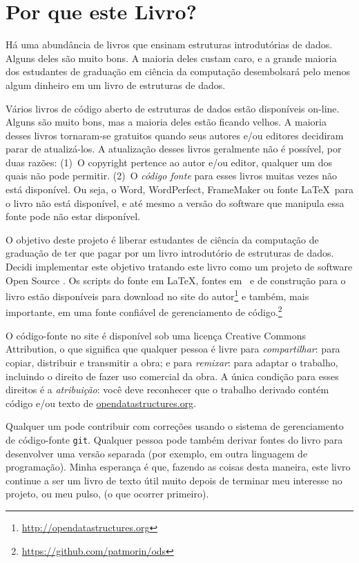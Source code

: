 \chapter*{Por que este Livro?}

Há uma abundância de livros que ensinam estruturas introdutórias de dados.
Alguns deles são muito bons. A maioria deles custam caro, e a grande 
maioria dos estudantes de graduação em ciência da computação 
desembolsará pelo menos algum dinheiro em um livro de estruturas 
de dados.

Vários livros de código aberto de estruturas de dados estão disponíveis on-line. Alguns são muito bons, mas a maioria deles estão ficando velhos. A maioria desses livros tornaram-se gratuitos quando seus autores e/ou editores decidiram parar de atualizá-los. A atualização desses livros geralmente não é possível, por duas razões: (1)~O copyright pertence ao autor e/ou editor, qualquer um dos quais não pode permitir. (2)~O \emph{código fonte} para esses livros muitas vezes não está disponível. Ou seja, o Word, WordPerfect, FrameMaker ou fonte \LaTeX\ para o livro não está disponível, e até mesmo a versão do software que manipula essa fonte pode não estar disponível.

O objetivo deste projeto é liberar estudantes de ciência da computação de graduação de ter que pagar por um livro introdutório de estruturas de dados.
Decidi implementar este objetivo tratando este livro como um projeto de software Open Source
. 
Os scripts do fonte em \LaTeX, fontes em \lang\ e de construção para o livro estão disponíveis para download no site do autor\footnote{\url{http://opendatastructures.org}} e também, mais importante, em uma fonte confiável de gerenciamento de código.\footnote{\url{https://github.com/patmorin/ods}}

O código-fonte no site é disponível sob uma licença Creative Commons Attribution, o que significa que qualquer pessoa é livre para \emph{compartilhar}:
 para copiar, distribuir e transmitir a obra; e para \emph{remixar}:
para adaptar o trabalho, incluindo o direito de fazer uso comercial da obra. A única condição para esses direitos é a \emph{atribuição}: você deve reconhecer que o trabalho derivado contém código e/ou texto de \url{opendatastructures.org}.

Qualquer um pode contribuir com correções usando o sistema de gerenciamento de código-fonte \texttt{git}.
Qualquer pessoa pode também derivar fontes do livro para desenvolver uma versão separada (por exemplo, em outra linguagem de programação).
Minha esperança é que, fazendo as coisas desta maneira, este livro continue a ser um livro de texto útil muito depois de terminar meu interesse no projeto, ou meu pulso,
(o que ocorrer primeiro).



